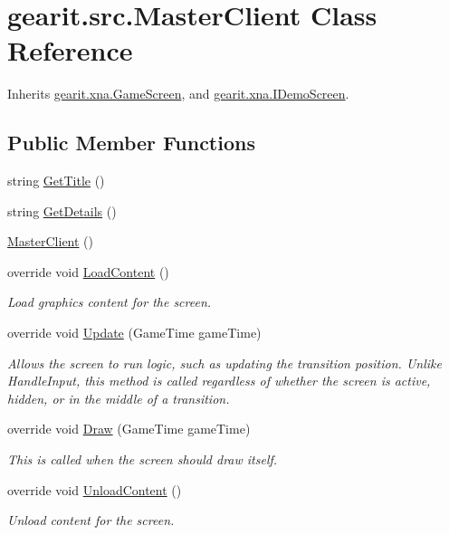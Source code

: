 \hypertarget{classgearit_1_1src_1_1_master_client}{\section{gearit.\+src.\+Master\+Client Class Reference}
\label{classgearit_1_1src_1_1_master_client}
}


Inherits \hyperlink{classgearit_1_1xna_1_1_game_screen}{gearit.\+xna.\+Game\+Screen}, and \hyperlink{interfacegearit_1_1xna_1_1_i_demo_screen}{gearit.\+xna.\+I\+Demo\+Screen}.

\subsection*{Public Member Functions}
\begin{DoxyCompactItemize}
\item 
string \hyperlink{classgearit_1_1src_1_1_master_client_ab58edf07cae96960e5206ac5bff85414}{Get\+Title} ()
\item 
string \hyperlink{classgearit_1_1src_1_1_master_client_aaef2f7e05ce236364efa3d47458cf918}{Get\+Details} ()
\item 
\hyperlink{classgearit_1_1src_1_1_master_client_a2dae3d6b92259f7a78a32edf2e2e31a2}{Master\+Client} ()
\item 
override void \hyperlink{classgearit_1_1src_1_1_master_client_a1d52e930af747db31f62490e393b0424}{Load\+Content} ()
\begin{DoxyCompactList}\small\item\em Load graphics content for the screen. \end{DoxyCompactList}\item 
override void \hyperlink{classgearit_1_1src_1_1_master_client_a5082036770cb8de251ab339bc68fb75d}{Update} (Game\+Time game\+Time)
\begin{DoxyCompactList}\small\item\em Allows the screen to run logic, such as updating the transition position. Unlike Handle\+Input, this method is called regardless of whether the screen is active, hidden, or in the middle of a transition. \end{DoxyCompactList}\item 
override void \hyperlink{classgearit_1_1src_1_1_master_client_aacf652e5fc85eb5a6ad1c244299839e7}{Draw} (Game\+Time game\+Time)
\begin{DoxyCompactList}\small\item\em This is called when the screen should draw itself. \end{DoxyCompactList}\item 
override void \hyperlink{classgearit_1_1src_1_1_master_client_a0a6b7f07531ee7241e92d7dcad434802}{Unload\+Content} ()
\begin{DoxyCompactList}\small\item\em Unload content for the screen. \end{DoxyCompactList}\end{DoxyCompactItemize}
